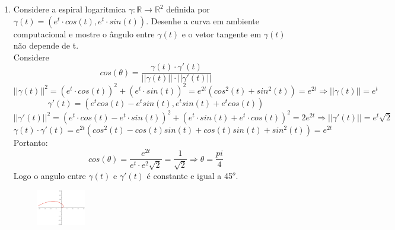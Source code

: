 \documentclass{article}
\begin{document}
\begin{enumerate}
    \item Considere a espiral logaritmica $\gamma : \mathbb{R} \to \mathbb{R}^2$ definida por $\gamma(t) = (e^t \cdot cos(t), e^t \cdot sin(t))$. Desenhe a curva em ambiente computacional e mostre o ângulo entre $\gamma(t)$ e o vetor tangente em $\gamma(t)$ não depende de t. \ 
        \\
        Considere
        $$cos(\theta) = \frac{\gamma(t) \cdot \gamma'(t)}{||\gamma(t)|| \cdot ||\gamma'(t)||}$$
        $$||\gamma(t)||^2 = (e^t \cdot cos(t))^2 + (e^t \cdot sin(t))^2 = e^{2t} (cos^2(t) + sin^2(t)) = e^{2t} \Rightarrow ||\gamma(t)|| = e^t $$
        $$\gamma'(t) = (e^tcos(t)-e^tsin(t), e^tsin(t)+e^tcos(t))$$
        $$||\gamma'(t)||^2 = (e^t \cdot cos(t) - e^t \cdot sin(t))^2 + (e^t \cdot sin(t) + e^t \cdot cos(t))^2 = 2e^{2t} \Rightarrow ||\gamma'(t)|| = e^t\sqrt{2} $$
        $$\gamma(t) \cdot \gamma'(t) = e^{2t}(cos^2(t) - cos(t)sin(t)+cos(t)sin(t) + sin^2(t)) = e^{2t}$$
        Portanto:
        $$cos(\theta) = \frac{e^{2t}}{e^t \cdot e^2\sqrt{2}} = \frac{1}{\sqrt{2}} \Rightarrow \theta = \frac{pi}{4}$$
        Logo o angulo entre $\gamma(t)$ e $\gamma'(t)$ é constante e igual a 45$^o$. \\
        \begin{figure}[!h]
            \centering
            \includegraphics[width=0.2\textwidth]{imgs/esp_log.png}
            \label{fig:exercício 7}
        \end{figure}
\end{enumerate}
\end{document}
